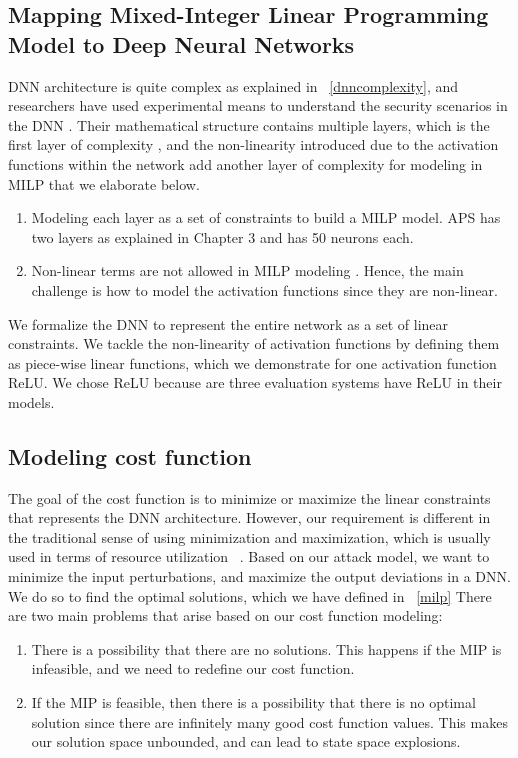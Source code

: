 \subsection{ Mapping  Mixed-Integer Linear Programming Model to Deep Neural Networks}

DNN architecture is quite complex as explained in ~\ref{dnncomplexity}, and researchers have used experimental means to understand the security scenarios in the DNN . 
Their   mathematical structure contains multiple layers, which is the first layer of complexity , and the non-linearity introduced due to the activation functions within the network add another layer of complexity for modeling in \ac{MILP}  that we elaborate below.  

\begin{enumerate}
	\item Modeling each layer as a set of constraints to build a \ac{MILP} model.
	\ac{APS} has two layers as explained in Chapter 3 and has 50 neurons each. 
	\item Non-linear terms are not allowed in \ac{MILP} modeling . Hence, the main challenge is how to model the activation functions since they are non-linear. 
\end{enumerate}

We formalize the \ac{DNN} to represent the entire network as a set of linear constraints. 
We tackle the non-linearity of activation functions by defining them as piece-wise linear functions, 
which we demonstrate for one activation function ReLU.
We chose ReLU because are three evaluation systems have ReLU in their models. 

\subsection{Modeling cost function}
The goal of the cost function is to minimize or maximize the linear constraints that represents the \ac{DNN} architecture. 
However, our requirement is different in the traditional sense of using minimization and maximization, which is usually used in terms of resource utilization ~\cite{7214162}.  
Based on our attack model, we want to minimize the input perturbations, and maximize the output deviations in a \ac{DNN}.
We do so to find the optimal solutions, which we have defined in  ~\ref{milp}
There are two main problems that arise based on our cost function modeling:
\begin{enumerate}
	\item There is a possibility that there are no solutions. 
	This happens if the \ac{MIP} is infeasible,  and we need to redefine our cost function. 
	\item If the \ac{MIP} is feasible, then there is a possibility that there is no optimal solution since there are infinitely many good cost function values. 
	This makes our solution space unbounded, and can lead to state space explosions. 
\end{enumerate}

